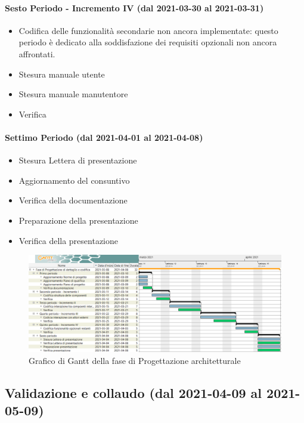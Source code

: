 \paragraph{Sesto Periodo - Incremento IV (dal 2021-03-30 al 2021-03-31)}
\begin{itemize}
	\item Codifica delle funzionalità secondarie non ancora implementate: questo periodo è dedicato alla soddisfazione dei requisiti opzionali non ancora affrontati.
	\item Stesura manuale utente
	\item Stesura manuale manutentore
	\item Verifica
\end{itemize}

\paragraph{Settimo Periodo (dal 2021-04-01 al 2021-04-08)}
\begin{itemize}
	\item Stesura Lettera di presentazione
	\item Aggiornamento del consuntivo
	\item Verifica della documentazione
	\item Preparazione della presentazione
	\item Verifica della presentazione
\end{itemize}

\begin{landscape}
	\begin{figure}[H]
		\centering
		\includegraphics[width=\linewidth]{res/images/ganttFase3.png}
		\caption{Grafico di Gantt della fase di Progettazione architetturale}
		\label{fig:Gantt Analisi dei requisiti}
	\end{figure}
\end{landscape}

\subsection{Validazione e collaudo (dal 2021-04-09 al 2021-05-09)}

